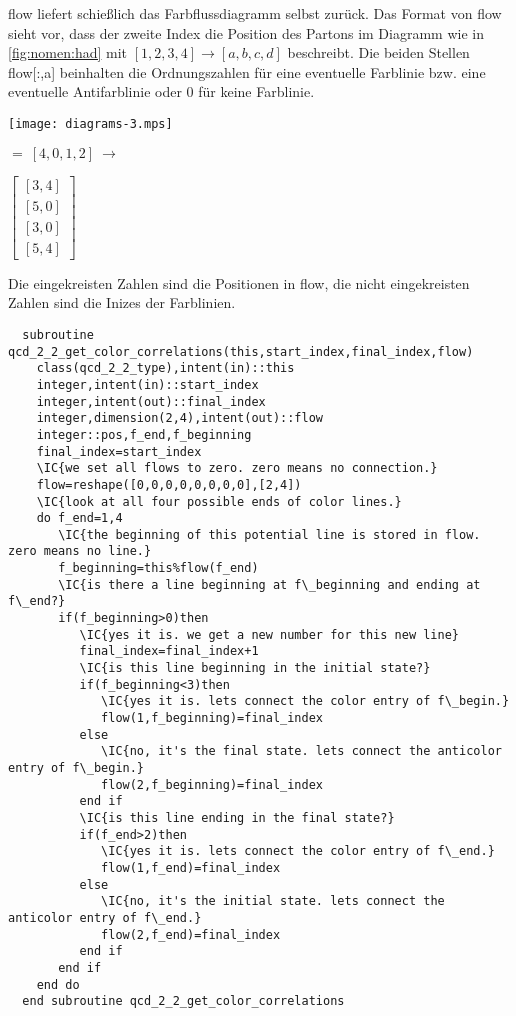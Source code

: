 flow liefert schießlich das Farbflussdiagramm selbst zurück. Das Format von flow sieht vor, dass der zweite Index die Position des Partons im Diagramm wie in \ref{fig:nomen:had} mit $[1,2,3,4]\rightarrow [a,b,c,d]$ beschreibt. Die beiden Stellen flow[:,a] beinhalten die Ordnungszahlen für eine eventuelle Farblinie bzw. eine eventuelle Antifarblinie oder 0 für keine Farblinie.
\begin{center}
\parbox{4cm}{\texttt{[image: diagrams-3.mps]}}\parbox{3cm}{$=\ [4,0,1,2]\ \rightarrow$}\parbox{2cm}{$\left[\begin{matrix}[3,4]\\ [5,0]\\ [3,0]\\ [5,4]\end{matrix}\right]$}
\end{center}
Die eingekreisten Zahlen sind die Positionen in flow, die nicht eingekreisten Zahlen sind die Inizes der Farblinien.
\begin{Verbatim}
  subroutine qcd_2_2_get_color_correlations(this,start_index,final_index,flow)
    class(qcd_2_2_type),intent(in)::this
    integer,intent(in)::start_index
    integer,intent(out)::final_index
    integer,dimension(2,4),intent(out)::flow
    integer::pos,f_end,f_beginning
    final_index=start_index
    \IC{we set all flows to zero. zero means no connection.}
    flow=reshape([0,0,0,0,0,0,0,0],[2,4])
    \IC{look at all four possible ends of color lines.}
    do f_end=1,4
       \IC{the beginning of this potential line is stored in flow. zero means no line.}
       f_beginning=this%flow(f_end)
       \IC{is there a line beginning at f\_beginning and ending at f\_end?}
       if(f_beginning>0)then
          \IC{yes it is. we get a new number for this new line}
          final_index=final_index+1
          \IC{is this line beginning in the initial state?}
          if(f_beginning<3)then
             \IC{yes it is. lets connect the color entry of f\_begin.}         
             flow(1,f_beginning)=final_index
          else
             \IC{no, it's the final state. lets connect the anticolor entry of f\_begin.}
             flow(2,f_beginning)=final_index
          end if
          \IC{is this line ending in the final state?}
          if(f_end>2)then
             \IC{yes it is. lets connect the color entry of f\_end.}
             flow(1,f_end)=final_index
          else
             \IC{no, it's the initial state. lets connect the anticolor entry of f\_end.}
             flow(2,f_end)=final_index
          end if
       end if
    end do
  end subroutine qcd_2_2_get_color_correlations
\end{Verbatim}

